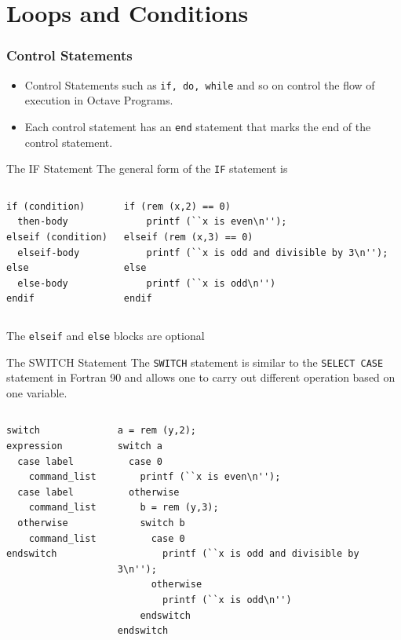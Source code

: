 \documentclass[slidestop,mathserif,compress,xcolor=svgnames]{beamer}
\newenvironment{eblock}[0]
{
\begin{beamerboxesrounded}[upper=uppercol2,lower=lowercol2,shadow=true]}
{\end{beamerboxesrounded}}
\begin{document}
\section{Loops and Conditions}
\begin{frame}
  \frametitle{\small Control Statements}
  \begin{itemize}
    \item Control Statements such as \texttt{if, do, while} and so on control the flow of execution in Octave Programs.
    \item Each control statement has an \texttt{end} statement that marks the end of the control statement.
  \end{itemize}
  \begin{eblock}{The IF Statement}
    The general form of the \texttt{IF} statement is
    {\tiny
      \begin{columns}
        \column{4cm}
        \begin{verbatim}
if (condition)
  then-body
elseif (condition)
  elseif-body
else
  else-body
endif
        \end{verbatim}
        \column{6cm}
        \begin{verbatim}
if (rem (x,2) == 0)
    printf (``x is even\n'');
elseif (rem (x,3) == 0)
    printf (``x is odd and divisible by 3\n'');
else
    printf (``x is odd\n'')
endif
        \end{verbatim}
      \end{columns}
    }
    The \texttt{elseif} and \texttt{else} blocks are optional
  \end{eblock}

  \begin{eblock}{The SWITCH Statement}
    The \texttt{SWITCH} statement is similar to the \texttt{SELECT CASE} statement in Fortran 90 and allows one to carry out different operation based on one variable.
    {\tiny
      \begin{columns}
        \column{3cm}
        \begin{verbatim}
switch expression
  case label
    command_list
  case label
    command_list
  otherwise
    command_list
endswitch
        \end{verbatim}
        \column{7cm}
        \begin{verbatim}
a = rem (y,2);
switch a
  case 0
    printf (``x is even\n'');
  otherwise
    b = rem (y,3);
    switch b
      case 0
        printf (``x is odd and divisible by 3\n'');
      otherwise
        printf (``x is odd\n'')
    endswitch
endswitch
        \end{verbatim}
      \end{columns}
    }
  \end{eblock}


\end{frame}
\end{document}
